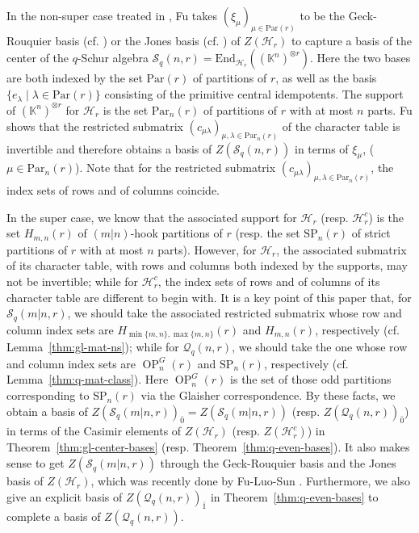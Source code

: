 \documentclass[11pt]{amsart}
\numberwithin{equation}{section}
\theoremstyle{plain}
\theoremstyle{definition}
\theoremstyle{remark}
\begin{document}
In the non-super case treated in \cite{Fu21}, Fu takes $(\xi_\mu)_{\mu\in\mathrm{Par}(r)}$ to be the Geck-Rouquier basis (cf. \cite{GR97}) or the Jones basis (cf. \cite{Jo90}) of $Z(\mathcal{H}_r)$ to capture a basis of the center of the $q$-Schur algebra $\mathcal{S}_q(n,r)=\mathrm{End}_{\mathcal{H}_r}((\mathbb{K}^n)^{\otimes r})$. Here the two bases are both indexed by the set $\mathrm{Par}(r)$ of partitions of $r$, as well as the basis $\{e_\lambda\mid\lambda\in\mathrm{Par}(r)\}$ consisting of the primitive central idempotents. The support of $(\mathbb{K}^n)^{\otimes r}$ for $\mathcal{H}_r$ is the set $\mathrm{Par}_n(r)$ of partitions of $r$ with at most $n$ parts. Fu shows that the restricted submatrix $(c_{\mu\lambda})_{\mu,\lambda\in\mathrm{Par}_n(r)}$ of the character table is invertible and therefore obtains a basis of $Z(\mathcal{S}_q(n,r))$ in terms of $\xi_\mu$, ($\mu\in \mathrm{Par}_n(r)$). Note that for the restricted submatrix $(c_{\mu\lambda})_{\mu,\lambda\in\mathrm{Par}_n(r)}$, the index sets of rows and of columns coincide.

In the super case, we know that the associated support for $\mathcal{H}_r$ (resp. $\mathcal{H}_r^c$) is the set $H_{m,n}(r)$ of $(m|n)$-hook partitions of $r$ (resp. the set $\mathrm{SP}_n(r)$ of strict partitions of $r$ with at most $n$ parts). 
However, for $\mathcal{H}_r$, the associated submatrix of its character table, with rows and columns both indexed by the supports, may not be invertible; while for $\mathcal{H}_r^c$, the index sets of rows and of columns of its character table are different to begin with.
It is a key point of this paper that, for $\mathcal{S}_q(m|n,r)$, we should take the associated restricted submatrix whose row and column index sets are $H_{\min\{m,n\},\max\{m,n\}}(r)$ and $H_{m,n}(r)$, respectively (cf. Lemma~\ref{thm:gl-mat-ns}); while for $\mathcal{Q}_q(n,r)$, we should take the one whose row and column index sets are $\operatorname{OP}_n^G(r)$ and $\mathrm{SP}_n(r)$, respectively (cf. Lemma~\ref{thm:q-mat-class}). Here $\operatorname{OP}_n^G(r)$ is the set of those odd partitions corresponding to $\mathrm{SP}_n(r)$ via the Glaisher correspondence. By these facts, we obtain a basis of $Z(\mathcal{S}_q(m|n,r))_{\bar{0}}=Z(\mathcal{S}_q(m|n,r))$ (resp. $Z(\mathcal{Q}_q(n,r))_{\bar{0}}$) in terms of the Casimir elements of $Z(\mathcal{H}_r)$ (resp. $Z(\mathcal{H}_r^c)$) in Theorem~\ref{thm:gl-center-bases} (resp. Theorem~\ref{thm:q-even-bases}). It also makes sense to get $Z(\mathcal{S}_q(m|n,r))$ through the Geck-Rouquier basis and the Jones basis of $Z(\mathcal{H}_r)$, which was recently done by Fu-Luo-Sun \cite{FLS26}. Furthermore, we also give an explicit basis of $Z(\mathcal{Q}_q(n,r))_{\bar{1}}$ in Theorem~\ref{thm:q-even-bases} to complete a basis of $Z(\mathcal{Q}_q(n,r))$.
\end{document}

